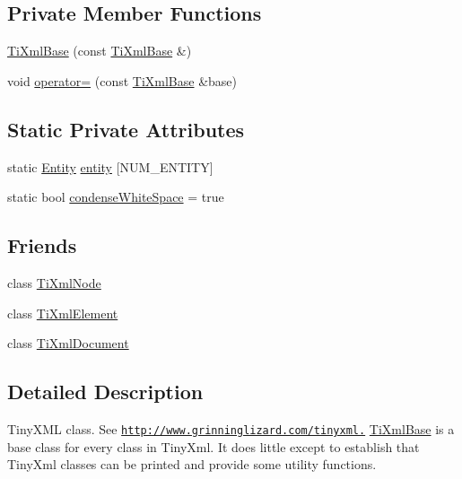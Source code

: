 \subsection*{Private Member Functions}
\begin{DoxyCompactItemize}
\item 
\hyperlink{class_ti_xml_base_a626975d7fb27b0a471142ca582b561b4}{TiXmlBase} (const \hyperlink{class_ti_xml_base}{TiXmlBase} \&)
\item 
void \hyperlink{class_ti_xml_base_a183315aa6f1bb36d509b179e912cb93f}{operator=} (const \hyperlink{class_ti_xml_base}{TiXmlBase} \&base)
\end{DoxyCompactItemize}
\subsection*{Static Private Attributes}
\begin{DoxyCompactItemize}
\item 
static \hyperlink{struct_ti_xml_base_1_1_entity}{Entity} \hyperlink{class_ti_xml_base_aae956c75fedff20d337f7cc109c6b71a}{entity} \mbox{[}NUM\_\-ENTITY\mbox{]}
\item 
static bool \hyperlink{class_ti_xml_base_a447a05f6a3edbb7892f66f9df8244a3d}{condenseWhiteSpace} = true
\end{DoxyCompactItemize}
\subsection*{Friends}
\begin{DoxyCompactItemize}
\item 
class \hyperlink{class_ti_xml_base_a218872a0d985ae30e78c55adc4bdb196}{TiXmlNode}
\item 
class \hyperlink{class_ti_xml_base_ab6592e32cb9132be517cc12a70564c4b}{TiXmlElement}
\item 
class \hyperlink{class_ti_xml_base_a173617f6dfe902cf484ce5552b950475}{TiXmlDocument}
\end{DoxyCompactItemize}


\subsection{Detailed Description}
TinyXML class. See \href{http://www.grinninglizard.com/tinyxml.}{\tt http://www.grinninglizard.com/tinyxml.} \hyperlink{class_ti_xml_base}{TiXmlBase} is a base class for every class in TinyXml. It does little except to establish that TinyXml classes can be printed and provide some utility functions.

